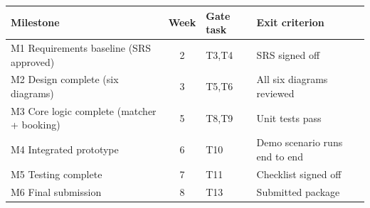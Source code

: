 \begin{tabular}{@{}p{5.4cm}c p{2cm} p{4cm}@{}}
\toprule
\textbf{Milestone} & \textbf{Week} & \textbf{Gate task} & \textbf{Exit criterion} \\ \midrule
M1 Requirements baseline (SRS approved) & 2 & T3,T4 & SRS signed off \\
M2 Design complete (six diagrams) & 3 & T5,T6 & All six diagrams reviewed \\
M3 Core logic complete (matcher + booking) & 5 & T8,T9 & Unit tests pass \\
M4 Integrated prototype & 6 & T10 & Demo scenario runs end to end \\
M5 Testing complete & 7 & T11 & Checklist signed off \\
M6 Final submission & 8 & T13 & Submitted package \\
\bottomrule
\end{tabular}
